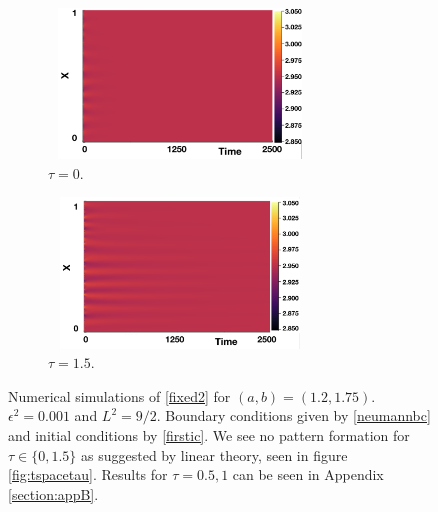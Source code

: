 \begin{figure}[H]
    \centering
    \begin{subfigure}[t]{0.45\textwidth}
        \centering
        \includegraphics[width=7cm,height=4cm]{p3t0.png}
        \caption{$\tau=0$.}
        \label{}
    \end{subfigure}
    \hfill
    \begin{subfigure}[t]{0.45\textwidth}
        \centering
        \includegraphics[width=7cm,height=4cm]{p3t15.png}
        \caption{$\tau=1.5$.}
        \label{}
    \end{subfigure}
    \caption{Numerical simulations of \eqref{fixed2} for $(a,b)=(1.2,1.75)$. $\epsilon^2=0.001$ and $L^2=9/2$. Boundary conditions given by \eqref{neumannbc} and initial conditions by \eqref{firstic}. We see no pattern formation for $\tau\in\{0,1.5\}$ as suggested by linear theory, seen in figure \ref{fig:tspacetau}. Results for $\tau=0.5,1$ can be seen in Appendix \ref{section:appB}.}
    \label{fig:testturing2}
\end{figure}


